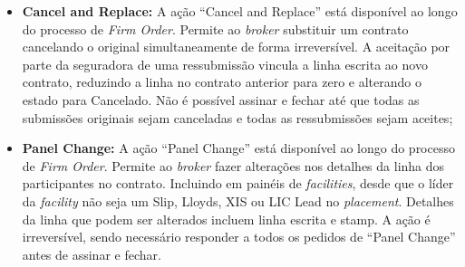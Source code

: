 \begin{itemize}
\begin{itemize}
                 \item \textbf{Cancel and Replace:}
                 A ação ``Cancel and Replace'' está disponível ao longo do processo de \textit{Firm Order}. Permite ao \textit{broker} substituir um contrato cancelando o original simultaneamente de forma irreversível. A aceitação por parte da seguradora de uma ressubmissão vincula a linha escrita ao novo contrato, reduzindo a linha no contrato anterior para zero e alterando o estado para Cancelado. Não é possível assinar e fechar até que todas as submissões originais sejam canceladas e todas as ressubmissões sejam aceites;
                 
                 \item \textbf{Panel Change:}
                 A ação ``Panel Change'' está disponível ao longo do processo de \textit{Firm Order}. Permite ao \textit{broker} fazer alterações nos detalhes da linha dos participantes no contrato. Incluindo em painéis de \textit{facilities}, desde que o líder da \textit{facility} não seja um Slip, Lloyds, XIS ou LIC Lead no \textit{placement}. Detalhes da linha que podem ser alterados incluem linha escrita e stamp. A ação é irreversível, sendo necessário responder a todos os pedidos de ``Panel Change'' antes de assinar e fechar.
            \end{itemize}           

\end{itemize}
